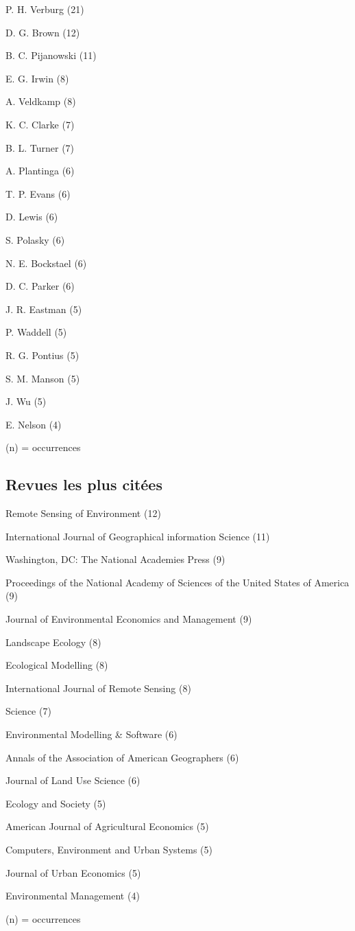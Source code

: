 \item P. H. Verburg (21)
\item D. G. Brown (12)
\item B. C. Pijanowski (11)
\item E. G. Irwin (8)
\item A. Veldkamp (8)
\item K. C. Clarke (7)
\item B. L. Turner (7)
\item A. Plantinga (6)
\item T. P. Evans (6)
\item D. Lewis (6)
\item S. Polasky (6)
\item N. E. Bockstael (6)
\item D. C. Parker (6)
\item J. R. Eastman (5)
\item P. Waddell (5)
\item R. G. Pontius (5)
\item S. M. Manson (5)
\item J. Wu (5)
\item E. Nelson (4)

\stopitemize

(n) = occurrences
\stopcolumns

\subsection
{Revues les plus citées}

\startitemize[n,packed]

\item Remote Sensing of Environment (12)
\item International Journal of Geographical information Science (11)
\item Washington, DC: The National Academies Press (9)
\item Proceedings of the National Academy of Sciences of the United States of America (9)
\item Journal of Environmental Economics and Management (9)
\item Landscape Ecology (8)
\item Ecological Modelling (8)
\item International Journal of Remote Sensing (8)
\item Science (7)
\item Environmental Modelling \& Software (6)
\item Annals of the Association of American Geographers (6)
\item Journal of Land Use Science (6)
\item Ecology and Society (5)
\item American Journal of Agricultural Economics (5)
\item Computers, Environment and Urban Systems (5)
\item Journal of Urban Economics (5)
\item Environmental Management (4)

\stopitemize

(n) = occurrences
